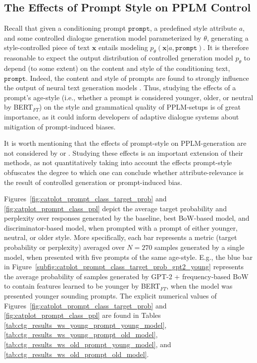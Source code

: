 \subsection{The Effects of Prompt Style on PPLM Control}
\label{subsec:ctg_anal_prompt_class}

Recall that given a conditioning prompt $\texttt{prompt}$, a predefined style attribute $a$, and some controlled dialogue generation model parameterized by $\theta$, generating a style-controlled piece of text $\textbf{x}$ entails modeling $p_{\theta}(\textbf{x} | a, \texttt{prompt})$. It is therefore reasonable to expect the output distribution of controlled generation model $p_{\theta}$ to depend (to some extent) on the content and style of the conditioning text, $\texttt{prompt}$. Indeed, the content and style of prompts are found to strongly influence the output of neural text generation models \citep{fan-etal-2018-hierarchical, lester2021power}. Thus, studying the effects of a prompt's age-style (i.e., whether a prompt is considered younger, older, or neutral by BERT$_{FT}$) on the style and grammatical quality of PPLM-setups is of great importance, as it could inform developers of adaptive dialogue systems about mitigation of prompt-induced biases.

It is worth mentioning that the effects of prompt-style on PPLM-generation are not considered by \cite{dathathri2019plug} or \cite{madotto-etal-2020-plug}. Studying these effects is an important extension of their methods, as not quantitatively taking into account the effects prompt-style obfuscates the degree to which one can conclude whether attribute-relevance is the result of controlled generation or prompt-induced bias.

Figures~\ref{fig:catplot_prompt_class_target_prob} and \ref{fig:catplot_prompt_class_ppl} depict the average target probability and perplexity over responses generated by the baseline, best BoW-based model, and discriminator-based model, when prompted with a prompt of either younger, neutral, or older style. More specifically, each bar represents a metric (target probability or perplexity) averaged over $N=270$ samples generated by a single model, when presented with five prompts of the same age-style. E.g., the blue bar in Figure~\ref{subfig:catplot_prompt_class_target_prob_gpt2_young} represents the average probability of samples generated by GPT-2 + frequency-based BoW to contain features learned to be younger by BERT$_{FT}$, when the model was presented younger sounding prompts. The explicit numerical values of Figures~\ref{fig:catplot_prompt_class_target_prob} and \ref{fig:catplot_prompt_class_ppl} are found in Tables \ref{tab:ctg_results_ws_young_prompt_young_model}, \ref{tab:ctg_results_ws_young_prompt_old_model}, \ref{tab:ctg_results_ws_old_prompt_young_model}, and \ref{tab:ctg_results_ws_old_prompt_old_model}.

